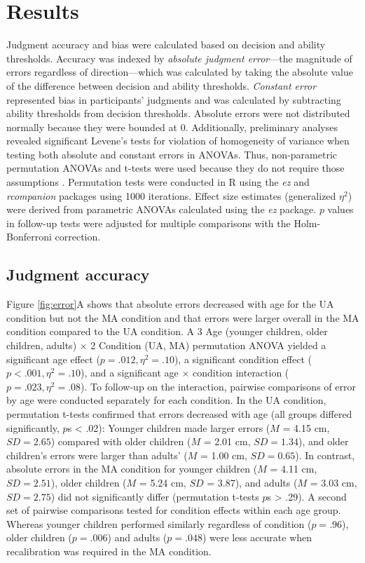 \documentclass[a4paper,man,natbib,floatsintext,noextraspace]{apa6}
\begin{document}
\section{Results}

Judgment accuracy and bias were calculated based on decision and ability thresholds. Accuracy was indexed by \textit{absolute judgment error}---the magnitude of errors regardless of direction---which was calculated by taking the absolute value of the difference between decision and ability thresholds. \textit{Constant error} represented bias in participants’ judgments and was calculated by subtracting ability thresholds from decision thresholds. Absolute errors were not distributed normally because they were bounded at 0. Additionally, preliminary analyses revealed significant Levene’s tests for violation of homogeneity of variance when testing both absolute and constant errors in ANOVAs. Thus, non-parametric permutation ANOVAs and t-tests were used because they do not require those assumptions \citep{Edgington}. Permutation tests were conducted in R using the \textit{ez} and \textit{rcompanion} packages using 1000 iterations. Effect size estimates (generalized $\eta^{2}$) were derived from parametric ANOVAs calculated using the \textit{ez} package. $p$ values in follow-up tests were adjusted for multiple comparisons with the Holm-Bonferroni correction.

\subsection{Judgment accuracy}

Figure \ref{fig:error}A shows that absolute errors decreased with age for the UA condition but not the MA condition and that errors were larger overall in the MA condition compared to the UA condition. A 3 Age (younger children, older children, adults) × 2 Condition (UA, MA) permutation ANOVA yielded a significant age effect ($p = .012, \eta^{2} = .10$), a significant condition effect ($p < .001, \eta^{2} = .10$), and a significant age × condition interaction ($p = .023, \eta^{2} = .08$). To follow-up on the interaction, pairwise comparisons of error by age were conducted separately for each condition. In the UA condition, permutation t-tests confirmed that errors decreased with age (all groups differed significantly, $p$s < .02): Younger children made larger errors ($M$ = 4.15 cm, $SD = 2.65$) compared with older children ($M$ = 2.01 cm, $SD = 1.34$), and older children's errors were larger than adults' ($M$ = 1.00 cm, $SD = 0.65$). In contrast, absolute errors in the MA condition for younger children ($M$ = 4.11 cm, $SD = 2.51$), older children ($M$ = 5.24 cm, $SD$ = 3.87), and adults ($M$ = 3.03 cm, $SD = 2.75$) did not significantly differ (permutation t-tests $p$s > .29). A second set of pairwise comparisons tested for condition effects within each age group. Whereas younger children performed similarly regardless of condition ($p = .96$), older children ($p = .006$) and adults ($p = .048$) were less accurate when recalibration was required in the MA condition.
\end{document}
